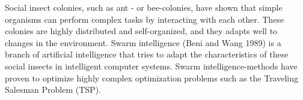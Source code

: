 
Social insect colonies, such as ant - or bee-colonies, have shown that simple organisms can perform complex tasks by interacting with each other. These colonies are highly distributed and self-organized, and they adapts well to changes in the environment. Swarm intelligence (Beni and Wang 1989) is a branch of artificial intelligence that tries to adapt the characteristics of these social insects in intelligent computer systems. Swarm intelligence-methods have proven to optimize highly complex optimization problems such as the Traveling Salesman Problem (TSP). 